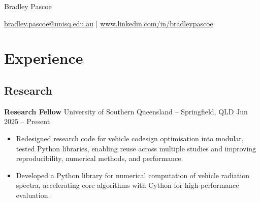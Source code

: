 \documentclass[11pt]{article}       %
\begin{document}
\centerline{\Huge Bradley Pascoe}

\vspace{5pt}

\centerline{\href{mailto:bradley.pascoe@unisq.edu.au}{bradley.pascoe@unisq.edu.au} | \href{https://www.linkedin.com/in/bradleypascoe}{www.linkedin.com/in/bradleypascoe}}

\vspace{-10pt}



\section*{Experience}

\subsection*{Research}
\vspace{-6pt}
\textbf{Research Fellow} {University of Southern Queensland} -- Springfield, QLD \hfill Jun 2025 -- Present \\
\vspace{-9pt}
\begin{itemize}
    \item Redesigned research code for vehicle codesign optimisation into modular, tested Python libraries, enabling reuse across multiple studies and improving reproducibility, numerical methods, and performance.
    \item Developed a Python library for numerical computation of vehicle radiation spectra, accelerating core algorithms with Cython for high-performance evaluation.
\end{itemize}
\end{document}
